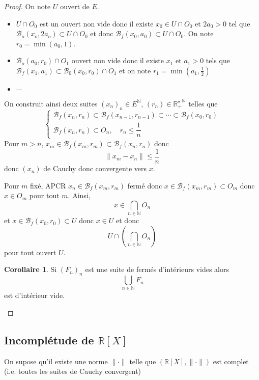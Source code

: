 \documentclass{article}
\theoremstyle{definition}
\newtheorem*{cor}{Corollaire}
\begin{document}
\begin{proof}
On note $U$ ouvert de $E$.
\begin{itemize}
    \item 
$U\cap O_0$ est un ouvert non vide donc il existe $x_0\in U\cap O_0$ et $2a_0>0$ tel que $\mathcal B_o(x_o, 2a_o)\subset U\cap O_0$ et donc $\mathcal B_f(x_0, a_0)\subset U\cap O_0$. On note $r_0=\min(a_0, 1)$.
\item $\mathcal B_o(a_0, r_0)\cap O_1$ ouvert non vide donc il existe $x_1$ et $a_1>0$ tels que $\mathcal B_f(x_1, a_1)\subset \mathcal B_0(x_0, r_0)\cap O_1$ et on note $r_1=\min\left(a_1, \frac12\right)$

\item $\cdots$
\end{itemize}
On construit ainsi deux suites $(x_n)_n\in E^{\mathbb N}$, $(r_n)\in\mathbb {R_+^\star}^{\mathbb N}$ telles que \[
    \begin{cases}
        \mathcal B_f(x_n, r_n)\subset \mathcal B_f(x_{n-1}, r_{n-1})\subset \cdots \subset \mathcal B_f(x_0, r_0) \\
        \mathcal B_f(x_n, r_n)\subset O_n, \quad r_n\leq \dfrac 1n
    \end{cases}
\]
Pour $m>n$, $x_m\in\mathcal B_f(x_m, r_m)\subset\mathcal B_f(x_n, r_n)$ donc \[
    \|x_m-x_n\|\leq \frac 1n
\]
donc $(x_n)$ de Cauchy donc convergente vers $x$.

Pour $m$ fixé, APCR $x_n\in\mathcal B_f(x_m, r_m)$ fermé donc $x\in\mathcal B_f(x_m, r_m)\subset O_m$ donc $x\in O_m$ pour tout $m$. Ainsi, \[
    x\in\bigcap_{n\in\mathbb N}O_n
\]
et $x\in\mathcal B_f(x_0, r_0)\subset U$ donc $x\in U$ et donc \[
    U\cap\left(\bigcap_{n\in\mathbb N}O_n\right)
\]
pour tout ouvert $U$.

\begin{cor}
Si $(F_n)_n$ est une suite de fermés d'intérieurs vides alors \[
    \bigcup_{n\in\mathbb N}F_n
\] est d'intérieur vide.
\end{cor}

\end{proof}

\subsection{Incomplétude de $\mathbb R[X]$}

On supose qu'il existe une norme $\|\cdot \|$ telle que $(\mathbb R[X], \|\cdot \|)$ est complet (i.e. toutes les suites de Cauchy convergent)
\end{document}
